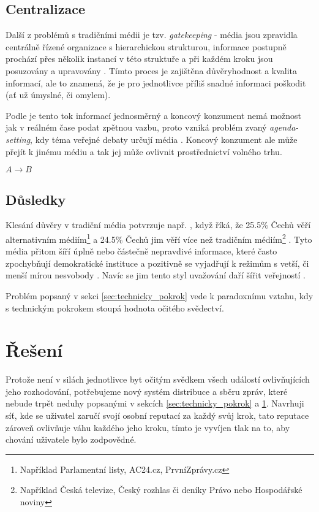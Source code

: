 \documentclass{report}
\begin{document}
\section{Centralizace}
\label{sec:centralizace}
Další z problémů s tradičními médii je tzv. \textit{gatekeeping} - média jsou zpravidla centrálně řízené organizace s hierarchickou strukturou, informace postupně prochází přes několik instancí v této struktuře a při každém kroku jsou posuzovány a upravovány \citep{mazzara13}. Tímto proces je zajištěna důvěryhodnost a kvalita informací, ale to znamená, že je pro jednotlivce příliš snadné informaci poškodit (ať už úmyslné, či omylem).

Podle \citeauthor{mazzara13} je tento tok informací jednosměrný a koncový konzument nemá možnost jak v reálném čase podat zpětnou vazbu, proto vzniká problém zvaný \textit{agenda-setting}, kdy téma veřejné debaty určují média \citep{mazzara13}. Koncový konzument ale může přejít k jinému médiu a tak jej může ovlivnit prostřednictví volného trhu.

$A \to B$

\section{Důsledky}
\label{sec:dusledky}
Klesání důvěry v tradiční média potvrzuje např. \citeauthor{janda16b}, když říká, že 25.5\% Čechů věří alternativním médiím\footnote{Například Parlamentní listy, AC24.cz, PrvníZprávy.cz} a 24.5\% Čechů jim věří více než tradičním médiím\footnote{Například Česká televize, Český rozhlas či deníky Právo nebo Hospodářské noviny} \citep{janda16b}. Tyto média přitom šíří úplně nebo částečně nepravdivé informace, které často zpochybňují demokratické instituce a pozitivně se vyjadřují k režimům s vetší, či menší mírou nesvobody \citep{janda16a}. Navíc se jim tento styl uvažování daří šířit veřejností \citep{janda16b}.

Problém popsaný v sekci \ref{sec:technicky_pokrok} vede k paradoxnímu vztahu, kdy s technickým pokrokem stoupá hodnota očitého svědectví.

\chapter{Řešení}
\label{ch:reseni}

Protože není v silách jednotlivce byt očitým svědkem všech událostí ovlivňujících jeho rozhodování, potřebujeme nový systém distribuce a sběru zpráv, které nebude trpět neduhy popsanými v sekcích \ref{sec:technicky_pokrok} a \ref{sec:centralizace}. Navrhuji síť, kde se uživatel zaručí svojí osobní reputací za každý svůj krok, tato reputace zároveň ovlivňuje váhu každého jeho kroku, tímto je vyvíjen tlak na to, aby chování uživatele bylo zodpovědné.
\end{document}
